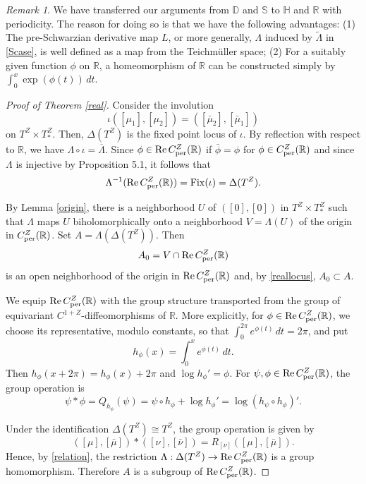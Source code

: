 \documentclass[amstex]{amsart}
\theoremstyle{definition}
\theoremstyle{remark}
\newtheorem{remark}[theorem]{Remark}
\numberwithin{equation}{section}
\begin{document}
\begin{remark}
We have transferred our arguments from $\mathbb D$ and $\mathbb S$ to $\mathbb H$ and $\mathbb R$ with periodicity.
The reason for doing so is that we have the following advantages:
(1) The pre-Schwarzian derivative map $L$, or more generally, $\Lambda$ induced by $\widetilde \Lambda$ in \eqref{Scase},
is well defined as a map from the Teichm\"uller space; 
(2) For a suitably given function $\phi$ on $\mathbb R$,
a homeomorphism of $\mathbb R$ can be constructed simply by $\int_0^x \exp(\phi(t))\,dt$.
\end{remark}

\begin{proof}[Proof of Theorem \ref{real}]
Consider the involution
$$
\iota([\mu_1],[\mu_2])=([\bar\mu_2],[\bar\mu_1])
$$
on $T^Z\times T^Z_*$. Then, $\Delta(T^Z)$ is the fixed point locus of $\iota$.
By reflection with respect to $\mathbb R$, we have
$\Lambda\circ\iota=\overline{\Lambda}$.
Since $\phi \in {\rm Re}\,C^Z_{\rm per}(\mathbb R)$ if $\bar \phi=\phi$ for $\phi \in C^Z_{\rm per}(\mathbb R)$ and since
$\Lambda$ is injective by Proposition 5.1, it follows that
\begin{equation}\label{reallocus}
 \Lambda^{-1}({\rm Re}\,C^Z_{\rm per}(\mathbb R))
 =\operatorname{Fix}(\iota)
 =\Delta(T^Z).
\end{equation}

By Lemma \ref{origin}, there is a neighborhood $U$ of
$([0],[0])$ in $T^Z\times T^Z_*$ such that $\Lambda$ maps $U$
biholomorphically onto a neighborhood
$V=\Lambda(U)$ of the origin in $C^Z_{\rm per}(\mathbb R)$.
Set $A=\Lambda(\Delta(T^Z))$.
Then
\[
 A_0=V\cap{\rm Re}\,C^Z_{\rm per}(\mathbb R)
\]
is an open neighborhood of the origin in
${\rm Re}\,C^Z_{\rm per}(\mathbb R)$ and, by \eqref{reallocus},
$A_0\subset A$.

We equip ${\rm Re}\,C^Z_{\rm per}(\mathbb R)$ with the group
structure transported from the group of equivariant
$C^{1+Z}$-diffeomorphisms of $\mathbb R$. More explicitly,
for $\phi\in{\rm Re}\,C^Z_{\rm per}(\mathbb R)$, we choose its
representative, modulo constants, so that
$\int_0^{2\pi}e^{\phi(t)}\,dt=2\pi$,
and put
\[
 h_\phi(x)=\int_0^x e^{\phi(t)}\,dt.
\]
Then $h_\phi(x+2\pi)=h_\phi(x)+2\pi$ and
$\log h_\phi'=\phi$. For $\psi,\phi\in
{\rm Re}\,C^Z_{\rm per}(\mathbb R)$, the group operation is
\[
 \psi*\phi
 =Q_{h_\phi}(\psi)
 =\psi\circ h_\phi+\log h_\phi'
 =\log (h_\psi\circ h_\phi)'.
\]

Under the identification $\Delta(T^Z)\cong T^Z$, the group
operation is given by
\[
 ([\mu],[\bar\mu])*([\nu],[\bar\nu])
 =
 R_{[\nu]}([\mu],[\bar\mu]).
\]
Hence, by \eqref{relation}, the restriction
$\Lambda:\Delta(T^Z)\to
{\rm Re}\,C^Z_{\rm per}(\mathbb R)$
is a group homomorphism. Therefore $A$ is a subgroup of
${\rm Re}\,C^Z_{\rm per}(\mathbb R)$.


\end{proof}
\end{document}
